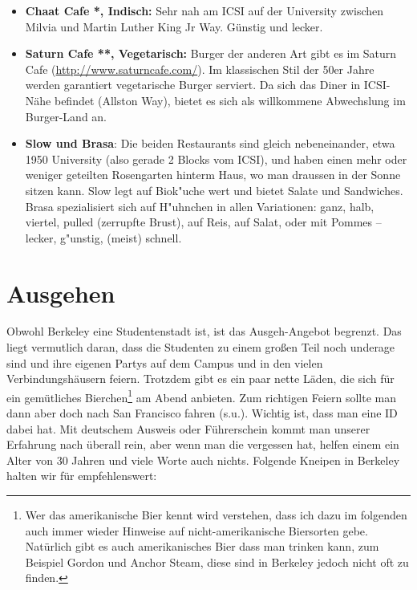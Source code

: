 \documentclass[a4paper]{scrreprt}
\begin{document}
\begin{itemize}
  \item \textbf{Chaat Cafe *, Indisch:} Sehr nah am ICSI auf der University zwischen Milvia und Martin Luther King Jr Way. Günstig und lecker.   
  
  \item \textbf{Saturn Cafe **, Vegetarisch:} Burger der anderen Art gibt es im Saturn Cafe (\url{http://www.saturncafe.com/}). Im klassischen Stil der 50er Jahre werden garantiert vegetarische Burger serviert. Da sich das Diner in ICSI-Nähe befindet (Allston Way), bietet es sich als willkommene Abwechslung im Burger-Land an.
  
  \item \textbf{Slow und Brasa}: Die beiden Restaurants sind gleich nebeneinander, etwa 1950 University (also gerade 2 Blocks vom ICSI), und haben einen mehr oder weniger geteilten Rosengarten hinterm Haus, wo man draussen in der Sonne sitzen kann. Slow legt auf Biok"uche wert und bietet Salate und Sandwiches. Brasa spezialisiert sich auf H"uhnchen in allen Variationen: ganz, halb, viertel, pulled (zerrupfte Brust), auf Reis, auf Salat, oder mit Pommes -- lecker, g"unstig, (meist) schnell.

\end{itemize}

\section{Ausgehen}

Obwohl Berkeley eine Studentenstadt ist, ist das Ausgeh-Angebot begrenzt. Das liegt vermutlich daran, dass die Studenten zu einem großen Teil noch underage sind und ihre eigenen Partys auf dem Campus und in den vielen Verbindungshäusern feiern. Trotzdem gibt es ein paar nette Läden, die sich für ein gemütliches Bierchen\footnote{Wer das amerikanische Bier kennt wird verstehen, dass ich dazu im folgenden auch immer wieder Hinweise auf nicht-amerikanische Biersorten gebe. Natürlich gibt es auch amerikanisches Bier dass man trinken kann, zum Beispiel Gordon und Anchor Steam, diese sind in Berkeley jedoch nicht oft zu finden.} am Abend anbieten.  Zum richtigen Feiern sollte man dann aber doch nach San Francisco fahren (s.u.). Wichtig ist, dass man eine ID dabei hat. Mit deutschem Ausweis oder Führerschein kommt man unserer Erfahrung nach überall rein, aber wenn man die vergessen hat, helfen einem ein Alter von 30 Jahren und viele Worte auch nichts. Folgende Kneipen in Berkeley halten wir für empfehlenswert:
\end{document}
